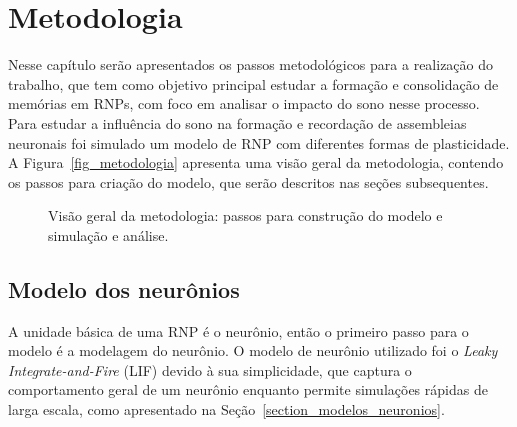 \chapter{Metodologia}

Nesse capítulo serão apresentados os passos metodológicos para a realização do trabalho, que tem como objetivo principal estudar a
formação e consolidação de memórias em RNPs, com foco em analisar o impacto do sono nesse processo. Para estudar a influência do
sono na formação e recordação de assembleias neu\-ro\-nais foi simulado um modelo de RNP com diferentes formas de plasticidade. A
Figura~\ref{fig_metodologia} apresenta uma visão geral da metodologia, contendo os passos para criação do modelo, que serão
descritos nas seções subsequentes.

\begin{figure}[!ht]
\caption{Visão geral da metodologia: passos para construção do modelo e simulação e análise.}
\end{figure}


\section{Modelo dos neurônios}

A unidade básica de uma RNP é o neurônio, então o primeiro passo para o modelo é a modelagem do neurônio. O modelo de neurônio
utilizado foi o \textit{Leaky Integrate-and-Fire} (LIF) devido à sua simplicidade, que captura o comportamento geral de um
neurônio enquanto permite simulações rápidas de larga escala, como apresentado na Seção~\ref{section_modelos_neuronios}.

